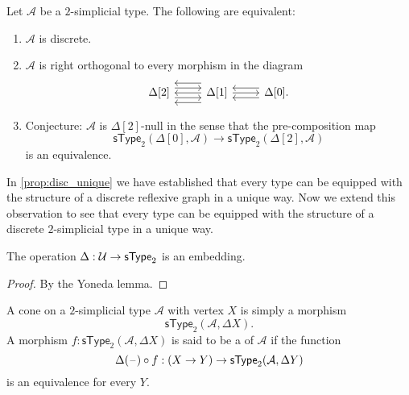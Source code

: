\begin{thm}
Let $\mathcal{A}$ be a $2$-simplicial type. The following are equivalent:
\begin{enumerate}
\item $\mathcal{A}$ is discrete.
\item $\mathcal{A}$ is right orthogonal to every morphism in the diagram
\begin{equation*}
\begin{tikzcd}
\Delta[2] \arrow[r,yshift=1ex] \arrow[r,yshift=-1ex] & \Delta[1] \arrow[l,yshift=2ex] \arrow[l] \arrow[l,yshift=-2ex] \arrow[r] & \Delta[0]. \arrow[l,yshift=1ex] \arrow[l,yshift=-1ex]
\end{tikzcd}
\end{equation*}
\item Conjecture: $\mathcal{A}$ is $\Delta[2]$-null in the sense that the pre-composition map
\begin{equation*}
\mathsf{sType}_2(\Delta[0],\mathcal{A})\to \mathsf{sType}_2(\Delta[2],\mathcal{A})
\end{equation*}
is an equivalence.
\end{enumerate}
\end{thm}

In \cref{prop:disc_unique} we have established that every type can be equipped with the structure of a discrete reflexive graph in a unique way. Now we extend this observation to see that every type can be equipped with the structure of a discrete $2$-simplicial type in a unique way.

\begin{prp}
The operation $\Delta:\mathcal{U}\to \mathsf{sType}_2$ is an embedding.
\end{prp}

\begin{proof}
By the Yoneda lemma.
\end{proof}

\begin{defn}
A cone on a $2$-simplicial type $\mathcal{A}$ with vertex $X$ is simply a morphism
\begin{equation*}
\mathsf{sType}_2(\mathcal{A},\Delta X).
\end{equation*}
A morphism $f:\mathsf{sType}_2(\mathcal{A},\Delta X)$ is said to be a  of $\mathcal{A}$ if the function
\begin{equation*}
\Delta(\mathord{\hspace{1pt}\text{--}\hspace{1pt}})\circ f : (X\to Y) \to \mathsf{sType}_2(\mathcal{A},\Delta Y)
\end{equation*}
is an equivalence for every $Y$. 
\end{defn}

